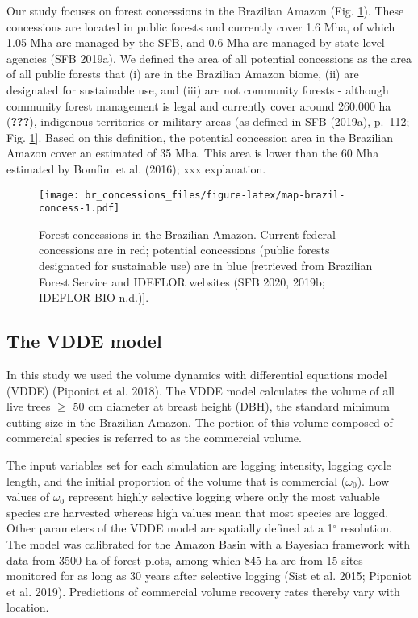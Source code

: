 \documentclass[
]{article}
\begin{document}
Our study focuses on forest concessions in the Brazilian Amazon (Fig. \ref{fig:map-brazil-concess}). These concessions are located in public forests and currently cover 1.6 Mha, of which 1.05 Mha are managed by the SFB, and 0.6 Mha are managed by state-level agencies (SFB 2019a). We defined the area of all potential concessions as the area of all public forests that (i) are in the Brazilian Amazon biome, (ii) are designated for sustainable use, and (iii) are not community forests - although community forest management is legal and currently cover around 260.000 ha ({\textbf{???}}), indigenous territories or military areas (as defined in SFB (2019a), p.~112; Fig. \ref{fig:map-brazil-concess}{]}. Based on this definition, the potential concession area in the Brazilian Amazon cover an estimated of 35 Mha. This area is lower than the 60 Mha estimated by Bomfim et al. (2016); xxx explanation.

\begin{figure}
\centering
\texttt{[image: br\_concessions\_files/figure-latex/map-brazil-concess-1.pdf]}
\caption{\label{fig:map-brazil-concess}Forest concessions in the Brazilian Amazon. Current federal concessions are in red; potential concessions (public forests designated for sustainable use) are in blue {[}retrieved from Brazilian Forest Service and IDEFLOR websites (SFB 2020, 2019b; IDEFLOR-BIO n.d.){]}.}
\end{figure}

\hypertarget{the-vdde-model}{%
\subsection{The VDDE model}\label{the-vdde-model}}

In this study we used the volume dynamics with differential equations model (VDDE) (Piponiot et al. 2018). The VDDE model calculates the volume of all live trees \(\geq\) 50 cm diameter at breast height (DBH), the standard minimum cutting size in the Brazilian Amazon. The portion of this volume composed of commercial species is referred to as the commercial volume.

The input variables set for each simulation are logging intensity, logging cycle length, and the initial proportion of the volume that is commercial (\(\omega_0\)). Low values of \(\omega_0\) represent highly selective logging where only the most valuable species are harvested whereas high values mean that most species are logged. Other parameters of the VDDE model are spatially defined at a 1\(^\circ\) resolution. The model was calibrated for the Amazon Basin with a Bayesian framework with data from 3500 ha of forest plots, among which 845 ha are from 15 sites monitored for as long as 30 years after selective logging (Sist et al. 2015; Piponiot et al. 2019). Predictions of commercial volume recovery rates thereby vary with location.
\end{document}
